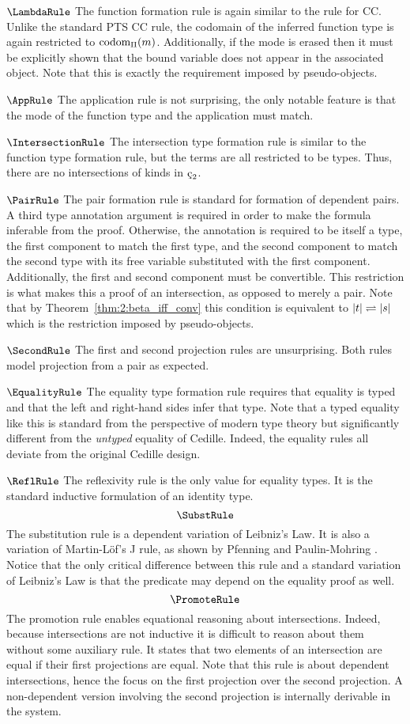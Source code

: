 $\LambdaRule$ The function formation rule is again similar to the rule for CC.
Unlike the standard PTS CC rule, the codomain of the inferred function type is again restricted to $\textnormal{codom}_\Pi(m)$.
Additionally, if the mode is erased then it must be explicitly shown that the bound variable does not appear in the associated object.
Note that this is exactly the requirement imposed by pseudo-objects.

$\AppRule$ The application rule is not surprising, the only notable feature is that the mode of the function type and the application must match.

$\IntersectionRule$ The intersection type formation rule is similar to the function type formation rule, but the terms are all restricted to be types.
Thus, there are no intersections of kinds in $\ced$.

$\PairRule$ The pair formation rule is standard for formation of dependent pairs.
A third type annotation argument is required in order to make the formula inferable from the proof.
Otherwise, the annotation is required to be itself a type, the first component to match the first type, and the second component to match the second type with its free variable substituted with the first component.
Additionally, the first and second component must be convertible.
This restriction is what makes this a proof of an intersection, as opposed to merely a pair.
Note that by Theorem~\ref{thm:2:beta_iff_conv} this condition is equivalent to $|t| \rightleftharpoons |s|$ which is the restriction imposed by pseudo-objects.

$\SecondRule$ The first and second projection rules are unsurprising.
Both rules model projection from a pair as expected.

$\EqualityRule$ The equality type formation rule requires that equality is typed and that the left and right-hand sides infer that type.
Note that a typed equality like this is standard from the perspective of modern type theory but significantly different from the \textit{untyped} equality of Cedille.
Indeed, the equality rules all deviate from the original Cedille design.



$\ReflRule$ The reflexivity rule is the only value for equality types.
It is the standard inductive formulation of an identity type.
$$\SubstRule$$
The substitution rule is a dependent variation of Leibniz's Law.
It is also a variation of Martin-L\"{o}f's J rule, as shown by Pfenning and Paulin-Mohring \cite{pfenning1990_subst}.
Notice that the only critical difference between this rule and a standard variation of Leibniz's Law is that the predicate may depend on the equality proof as well.
$$\PromoteRule$$
The promotion rule enables equational reasoning about intersections.
Indeed, because intersections are not inductive it is difficult to reason about them without some auxiliary rule.
It states that two elements of an intersection are equal if their first projections are equal.
Note that this rule is about dependent intersections, hence the focus on the first projection over the second projection.
A non-dependent version involving the second projection is internally derivable in the system.

